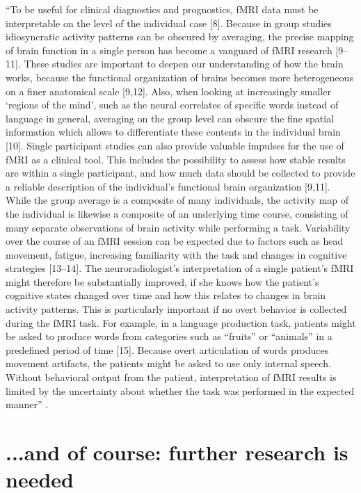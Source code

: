 ``To be useful for clinical diagnostics and prognostics, fMRI data must be
interpretable on the level of the individual case [8].
%
Because in group studies idiosyncratic activity patterns can be obscured by
averaging, the precise mapping of brain function in a single person has become a
vanguard of fMRI research [9–11].
%
These studies are important to deepen our understanding of how the brain works,
because the functional organization of brains becomes more heterogeneous on a
finer anatomical scale [9,12].
%
Also, when looking at increasingly smaller ‘regions of the mind’, such as the
neural correlates of specific words instead of language in general, averaging on
the group level can obscure the fine spatial information which allows to
differentiate these contents in the individual brain [10].
%
Single participant studies can also provide valuable impulses for the use of
fMRI as a clinical tool.
%
This includes the possibility to assess how stable results are within a single
participant, and how much data should be collected to provide a reliable
description of the individual’s functional brain organization [9,11].
%
While the group average is a composite of many individuals, the activity map of
the individual is likewise a composite of an underlying time course, consisting
of many separate observations of brain activity while performing a task.
%
Variability over the course of an fMRI session can be expected due to factors
such as head movement, fatigue, increasing familiarity with the task and changes
in cognitive strategies [13–14].
%
The neuroradiologist’s interpretation of a single patient’s fMRI might therefore
be substantially improved, if she knows how the patient’s cognitive states
changed over time and how this relates to changes in brain activity patterns.
%
This is particularly important if no overt behavior is collected during the fMRI
task.
%
For example, in a language production task, patients might be asked to produce
words from categories such as “fruits” or “animals” in a predefined period of
time [15].
%
Because overt articulation of words produces movement artifacts, the patients
might be asked to use only internal speech.
%
Without behavioral output from the patient, interpretation of fMRI results is
limited by the uncertainty about whether the task was performed in the expected
manner'' \citep{wegrzyn2018thought}.


\section{...and of course: further research is needed}

